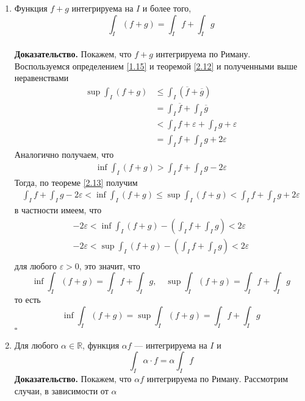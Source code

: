 \documentclass[a4paper]{article}
\newcommand{\qed}{\hfill$\square$}
\begin{document}
\begin{enumerate}
    \item Функция $f+g$ интегрируема на $I$ и более того,
    $$\int_I (f+g)=\int_I f + \int_I g$$\\[2mm]
    \textbf{Доказательство.} Покажем, что $f+g$ интегрируема по Риману. Воспользуемся определением \ref{1.15} и теоремой \ref{2.12} и полученными выше неравенствами\\
    $$\begin{aligned}
        \sup\int_I(f+g)&\leqslant\int_I (\overline{f}+\overline{g})\\
        &=\int_I\overline{f}+\int_I\overline{g}\\
        &<\int_I f+\varepsilon+\int_I g+\varepsilon\\
        &=\int_I f+\int_I g+2\varepsilon
    \end{aligned}$$
    Аналогично получаем, что
    $$\begin{aligned}
        \inf\int_I (f+g) >\int_I f +\int_I g-2\varepsilon
    \end{aligned}$$
    Тогда, по теореме \ref{2.13} получим
    $$\begin{aligned}
        \int_I f+\int_I g-2\varepsilon<\inf\int_I(f+g)\leqslant\sup\int_I(f+g)<\int_I f+\int_I g+2\varepsilon
    \end{aligned}$$
    в частности имеем, что
    $$\begin{aligned}
        -2\varepsilon<\inf\int_I(f+g)-\left(\int_I f+\int_I g\right)<2\varepsilon\\
        -2\varepsilon<\sup\int_I(f+g)-\left(\int_I f+\int_I g\right)<2\varepsilon\\
    \end{aligned}$$
    для любого $\varepsilon>0$, это значит, что 
    \begin{equation*}
        \inf\int_I(f+g)=\int_I f+\int_I g,\quad\sup\int_I(f+g)=\int_I f+\int_I g
    \end{equation*}
    то есть
    \begin{equation*}
        \inf\int_I(f+g)=\sup\int_I(f+g)=\int_I f+\int_I g
    \end{equation*}\qed
    \item Для любого $\alpha\in\mathbb{R}$, функция $\alpha f$ — интегрируема на $I$ и
    \begin{equation*}
        \int_I \alpha\cdot f=\alpha\int_I f
    \end{equation*}
    \textbf{Доказательство.} Покажем, что $\alpha f$ интегрируема по Риману. Рассмотрим случаи, в зависимости от $\alpha$\\[2mm]

\end{enumerate}
\end{document}
